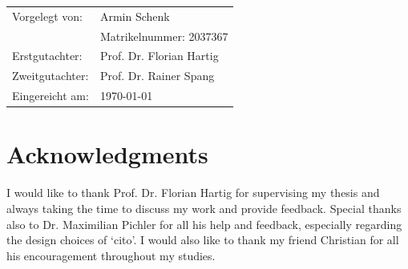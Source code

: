 \documentclass[12pt,twoside]{scrreport}
\newcommand{\pkg}[1]{`#1'}
\begin{document}
\begin{titlepage}
\begin{tabular}{ll}
Vorgelegt von: & Armin Schenk \\
& Matrikelnummer: 2037367 \\

Erstgutachter: & Prof. Dr. Florian Hartig\\
Zweitgutachter: & Prof. Dr. Rainer Spang \vspace{5mm}\\

Eingereicht am: & \today\\
\end{tabular}
\restoregeometry 
\end{titlepage}

\thispagestyle{empty}
\vspace*{\fill} %
\mbox{} %

\chapter*{Acknowledgments}
I would like to thank Prof. Dr. Florian Hartig for supervising my thesis and always taking the time to discuss my work and provide feedback. Special thanks also to Dr. Maximilian Pichler for all his help and feedback, especially regarding the design choices of \pkg{cito}. I would also like to thank my friend Christian for all his encouragement throughout my studies.

\newpage
\thispagestyle{empty}
\vspace*{\fill} %
\mbox{} %
\end{document}
